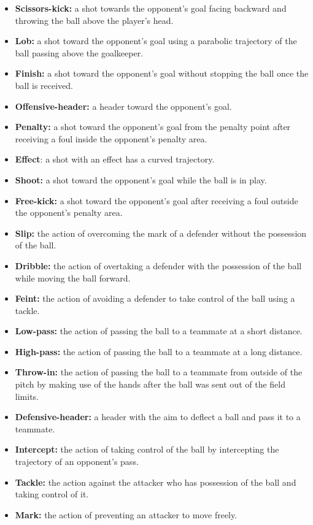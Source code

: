 \documentclass[12pt]{article}
\begin{document}
\begin{itemize}
\item \textbf{Scissors-kick: }a shot towards the opponent's goal facing backward and throwing the ball above the player's head.
\item \textbf{Lob: }a shot toward the opponent's goal using a parabolic trajectory of the ball passing above the goalkeeper.
\item \textbf{Finish: }a shot toward the opponent's goal without stopping the ball once the ball is received.
\item \textbf{Offensive-header: }a header toward the opponent's goal.
\item \textbf{Penalty: }a shot toward the opponent's goal from the penalty point after receiving a foul inside the opponent's penalty area.
\item \textbf{Effect}: a shot with an effect has a curved trajectory.
\item \textbf{Shoot: }a shot toward the opponent's goal while the ball is in play.
\item \textbf{Free-kick: }a shot toward the opponent's goal after receiving a foul outside the opponent's penalty area.
\item \textbf{Slip: }the action of overcoming the mark of a defender without the possession of the ball.
\item \textbf{Dribble: }the action of overtaking a defender with the possession of the ball while moving the ball forward.
\item \textbf{Feint: }the action of avoiding a defender to take control of the ball using a tackle.
\item \textbf{Low-pass: }the action of passing the ball to a teammate at a short distance.
\item \textbf{High-pass:} the action of passing the ball to a teammate at a long distance.
\item \textbf{Throw-in: }the action of passing the ball to a teammate from outside of the pitch by making use of the hands after the ball was sent out of the field limits.
\item \textbf{Defensive-header: }a header with the aim to deflect a ball and pass it to a teammate.
\item \textbf{Intercept:} the action of taking control of the ball by intercepting the trajectory of an opponent's pass.
\item \textbf{Tackle: }the action against the attacker who has possession of the ball and taking control of it.
\item \textbf{Mark: }the action of preventing an attacker to move freely.

\end{itemize}
\end{document}
